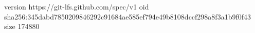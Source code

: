 version https://git-lfs.github.com/spec/v1
oid sha256:345dabd7850209846292c91684ae585ef794e49b8108dccf298a8f3a1b9f0f43
size 174880

